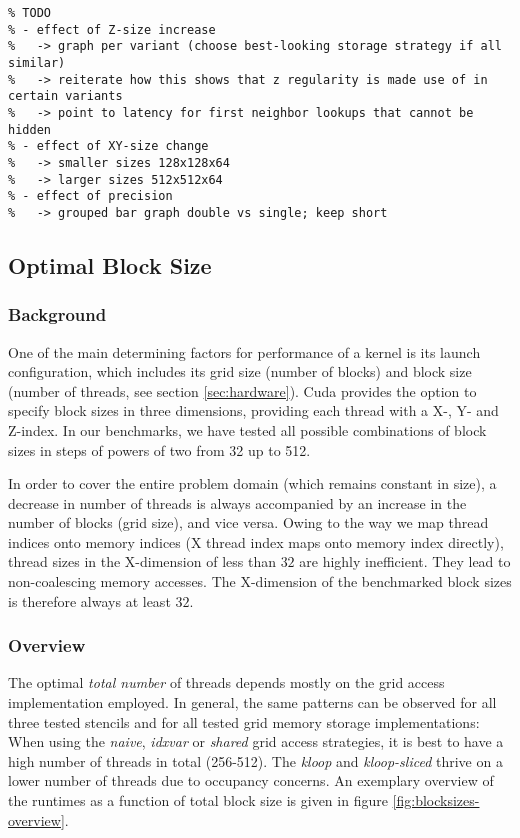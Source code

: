 \begin{verbatim}
% TODO
% - effect of Z-size increase
%   -> graph per variant (choose best-looking storage strategy if all similar)
%   -> reiterate how this shows that z regularity is made use of in certain variants
%   -> point to latency for first neighbor lookups that cannot be hidden
% - effect of XY-size change
%   -> smaller sizes 128x128x64
%   -> larger sizes 512x512x64
% - effect of precision
%   -> grouped bar graph double vs single; keep short
\end{verbatim}

\subsection{Optimal Block Size} \label{sec:res-blocksize}

\subsubsection{Background}

One of the main determining factors for performance of a kernel is its launch configuration, which includes its grid size (number of blocks) and block size (number of threads, see section \ref{sec:hardware}). Cuda provides the option to specify block sizes in three dimensions, providing each thread with a X-, Y- and Z-index. In our benchmarks, we have tested all possible combinations of block sizes in steps of powers of two from 32 up to 512.

In order to cover the entire problem domain (which remains constant in size), a decrease in number of threads is always accompanied by an increase in the number of blocks (grid size), and vice versa. Owing to the way we map thread indices onto memory indices (X thread index maps onto memory index directly), thread sizes in the X-dimension of less than $32$ are highly inefficient. They lead to non-coalescing memory accesses. The X-dimension of the benchmarked block sizes is therefore always at least $32$.

\subsubsection{Overview}

The optimal \emph{total number} of threads depends mostly on the grid access implementation employed. In general, the same patterns can be observed for all three tested stencils and for all tested grid memory storage implementations: When using the \emph{naive}, \emph{idxvar} or \emph{shared} grid access strategies, it is best to have a high number of threads in total (256-512). The \emph{kloop} and \emph{kloop-sliced} thrive on a lower number of threads due to occupancy concerns. An exemplary overview of the runtimes as a function of total block size is given in figure \ref{fig:blocksizes-overview}.

